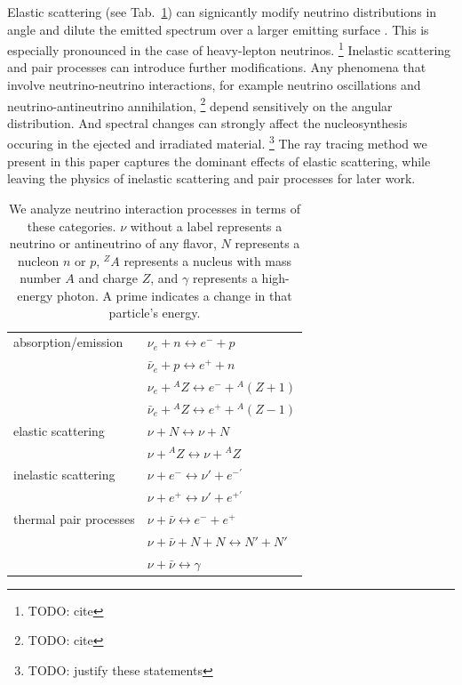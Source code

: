 \documentclass[aps,floatfix,prd,superscriptaddress,twocolumn]{revtex4-1}
\begin{document}
Elastic scattering (see Tab.~\ref{tab:neutrino_processes}) can signicantly
modify neutrino distributions in angle and dilute the emitted spectrum over a
larger emitting surface \citep{pere2016-asl}.
This is especially pronounced in the case of heavy-lepton neutrinos.
\footnote{TODO: cite}
Inelastic scattering and pair processes can introduce further modifications.
Any phenomena that involve neutrino-neutrino interactions,
for example neutrino oscillations and neutrino-antineutrino annihilation,
\footnote{TODO: cite}
depend sensitively on the angular distribution.
And spectral changes can strongly affect the nucleosynthesis
occuring in the ejected and irradiated material.
\footnote{TODO: justify these statements}
The ray tracing method we present in this paper captures the dominant effects
of elastic scattering, while leaving the physics of inelastic scattering and
pair processes for later work.

\begin{table}%
  \caption{
    We analyze neutrino interaction processes in terms of these categories.
    $\nu$ without a label represents a neutrino or antineutrino of any flavor,
    $N$ represents a nucleon $n$ or $p$,
    ${}^ZA$ represents a nucleus with mass number $A$ and charge $Z$, and
    $\gamma$ represents a high-energy photon.
    A prime indicates a change in that particle's energy.
  }
  \label{tab:neutrino_processes}
  \begin{tabularx}{\columnwidth}{X X}
    \hline \hline
    absorption/emission
    & $\nu_e + n \leftrightarrow e^- + p$                          \\
    & $\bar{\nu}_e + p \leftrightarrow e^+ + n$                    \\
    & $\nu_e + {}^AZ \leftrightarrow e^- + {}^A(Z+1)$              \\
    & $\bar{\nu}_e + {}^AZ \leftrightarrow e^+ + {}^A(Z-1)$        \\
    \hline
    elastic scattering
    & $\nu + N \leftrightarrow \nu + N$                            \\
    & $\nu + {}^AZ \leftrightarrow \nu + {}^AZ$                    \\
    \hline
    inelastic scattering
    & $\nu + e^- \leftrightarrow \nu' + e^{-'}$                    \\
    & $\nu + e^+ \leftrightarrow \nu' + e^{+'}$                    \\
    \hline
    thermal pair processes
    & $\nu + \bar{\nu} \leftrightarrow e^{-} + e^{+}$              \\
    & $\nu + \bar{\nu} + N + N \leftrightarrow N' + N'$            \\
    & $\nu + \bar{\nu} \leftrightarrow \gamma$                     \\
    \hline \hline
  \end{tabularx}
\end{table}
\end{document}
